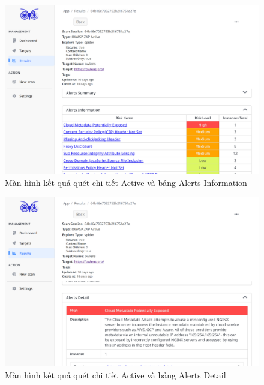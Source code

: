\begin{figure}[H]
      \centering
      \includegraphics[width=\textwidth]{applied-thesis-chapters/chapter-6/Màn hình kết quả quét chi tiết Active và bảng Alerts Information.png}
      \caption{Màn hình kết quả quét chi tiết Active và bảng Alerts Information}
      \label{fig:ManHinhKetQuaQuetChiTietActiveVaAlertsInformation}
\end{figure}

\begin{figure}[H]
      \centering
      \includegraphics[width=\textwidth]{applied-thesis-chapters/chapter-6/Màn hình kết quả quét chi tiết Active và bảng Alerts Detail.png}
      \caption{Màn hình kết quả quét chi tiết Active và bảng Alerts Detail}
      \label{fig:ManHinhKetQuaQuetChiTietActiveVaAlertsDetail}
\end{figure}

